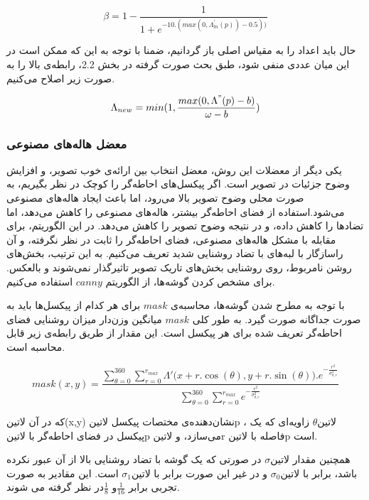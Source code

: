 \begin{equation}
	\beta = 1 - \frac{1}{1 + e^{-10.(max(0, \Lambda^{'}_{ln}(p)) - 0.5))}}
\end{equation}

حال باید اعداد را به مقیاس اصلی باز گردانیم، ضمنا با توجه به این که ممکن است در این میان عددی منفی شود، طبق بحث صورت گرفته در بخش 2.2، رابطه‌ی بالا را به صورت زیر اصلاح می‌کنیم.

\begin{equation}
	\Lambda_{new} = min(1, \frac{max(0, \Lambda^{"}(p) - b)}{\omega - b}) 
\end{equation}

\subsubsection{معضل هاله‌های مصنوعی  }

یکی دیگر از معضلات این روش، معضل انتخاب بین ارائه‌ی خوب تصویر، و افزایش وضوح جزئیات در تصویر است. اگر پیکسل‌های احاطه‌گر را کوچک در نظر بگیریم، به صورت محلی وضوح تصویر بالا می‌رود، اما باعث ایجاد هاله‌های مصنوعی می‌شود.استفاده از فضای احاطه‌گر بیشتر، هاله‌های مصنوعی را کاهش می‌دهد، اما تضادها را کاهش داده، و در نتیجه وضوح تصویر را کاهش می‌دهد.
در این الگوریتم، برای مقابله با مشکل هاله‌های مصنوعی، فضای احاطه‌گر را ثابت در نظر نگرفته، و آن راسازگار با لبه‌های با تضاد روشنایی شدید تعریف می‌کنیم. به این ترتیب، بخش‌های روشن نامربوط، روی روشنایی بخش‌های تاریک تصویر تاثیرگذار نمی‌شوند و بالعکس. 
برای مشخص کردن گوشه‌ها، از الگوریتم $canny$ استفاده می‌کنیم.

با توجه به مطرح شدن گوشه‌ها،  محاسبه‌ی $mask$ برای هر کدام از پیکسل‌ها باید به صورت جداگانه صورت گیرد. به طور کلی $mask$ میانگین وزن‌دار میزان روشنایی فضای احاطه‌گر تعریف شده برای هر پیکسل است. این مقدار از طریق رابطه‌ی زیر قابل محاسبه است. 

\begin{equation}
	mask(x,y) = \frac
	{\sum_{\theta=0}^{360}\sum_{r=0}^{r_{max}}
		\Lambda'\big(x+r.\cos(\theta), y+r.\sin(\theta) \big).e^{-\frac{r^2}{\sigma_{\theta,r}^2}}}
	{\sum_{\theta=0}^{360}\sum_{r=0}^{r_{max}}e^{-\frac{r^2}{\sigma_{\theta,r}^2}}}
\end{equation}

 
 که در آن 
 ‌لاتین{(x,y) }
 نشان‌دهنده‌ی مختصات پیکسل
  ‌لاتین{p } ، 
  ‌لاتین{$ \theta $ }
 زاویه‌ای که یک پیکسل در فضای احاطه‌گر با 
  ‌لاتین{p } 
 می‌سازد، و 
  ‌لاتین{r }
 فاصله  با
  ‌لاتین{p } 
   است.
 
 همچنین مقدار  
   ‌لاتین{$\sigma$}
  در صورتی که  یک گوشه با تضاد روشنایی بالا از آن عبور نکرده باشد، برابر با 
   ‌لاتین{$\sigma_{0}$}
   و در غیر این صورت برابر با 
   ‌لاتین{$\sigma_{1}$}
   است.
این مقادیر به صورت تجربی برابر $\frac{1}{16} $و $\frac{1}{8} $در نظر گرفته می شوند.
 

